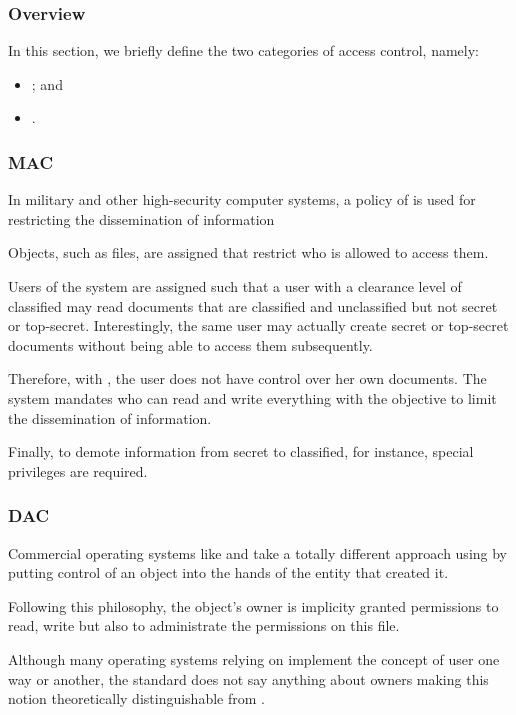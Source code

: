 
\begin{frame}
  \frametitle{Overview}

  In this section, we briefly define the two categories of access control,
  namely:

  \begin{itemize}
    \item
      ; and
    \item
      .
  \end{itemize}
\end{frame}


\begin{frame}
  \frametitle{MAC}

  In military and other high-security computer systems, a policy of
   is used for restricting the
  dissemination of information

  \-

  Objects, such as files, are assigned  that restrict who
  is allowed to access them.

  \-

  Users of the system are assigned  such that a user
  with a clearance level of classified may read documents that are classified
  and unclassified but not secret or top-secret. Interestingly, the same user
  may actually create secret or top-secret documents without being able to
  access them subsequently.

  \-

  Therefore, with , the user does not have control over her own
  documents. The system mandates who can read and write everything with the
  objective to limit the dissemination of information.

  \-

  Finally, to demote information from secret to classified, for instance,
  special privileges are required.
\end{frame}


\begin{frame}
  \frametitle{DAC}

  Commercial operating systems like  and  take a
  totally different approach using  by putting control of an object into the hands of the entity
  that created it.

  \-

  Following this philosophy, the object's owner is implicity granted
  permissions to read, write but also to administrate the permissions on
  this file.

  \-

  Although many operating systems relying on  implement the concept
  of user one way or another, the standard does not say anything about
  owners making this notion theoretically distinguishable from .
\end{frame}

